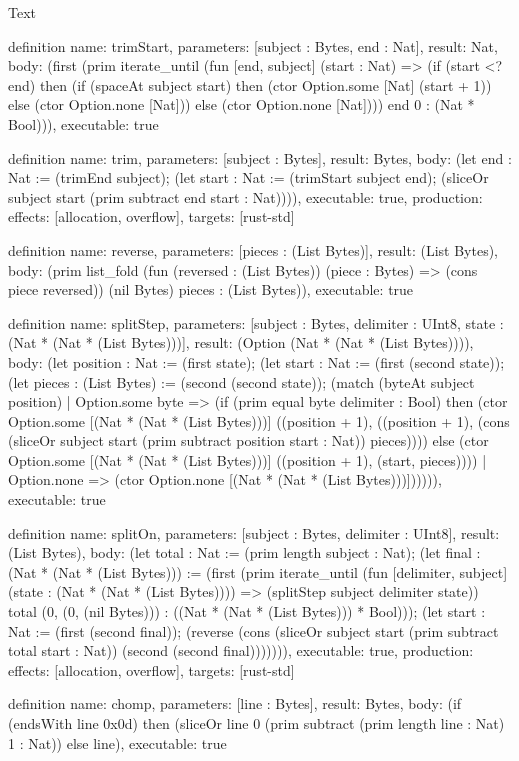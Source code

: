 \begin{lexlean}{Text}
\begin{semanticmodule}
definition{
  name: trimStart,
  parameters: [subject : Bytes, end : Nat],
  result: Nat,
  body: (first (prim iterate_until (fun [end, subject] (start : Nat) => (if (start <? end) then (if (spaceAt subject start) then (ctor Option.some [Nat] (start + 1)) else (ctor Option.none [Nat])) else (ctor Option.none [Nat]))) end 0 : (Nat * Bool))),
  executable: true
}

definition{
  name: trim,
  parameters: [subject : Bytes],
  result: Bytes,
  body: (let end : Nat := (trimEnd subject); (let start : Nat := (trimStart subject end); (sliceOr subject start (prim subtract end start : Nat)))),
  executable: true,
  production: {effects: [allocation, overflow], targets: [rust-std]}
}

definition{
  name: reverse,
  parameters: [pieces : (List Bytes)],
  result: (List Bytes),
  body: (prim list_fold (fun (reversed : (List Bytes)) (piece : Bytes) => (cons piece reversed)) (nil Bytes) pieces : (List Bytes)),
  executable: true
}

definition{
  name: splitStep,
  parameters: [subject : Bytes, delimiter : UInt8, state : (Nat * (Nat * (List Bytes)))],
  result: (Option (Nat * (Nat * (List Bytes)))),
  body: (let position : Nat := (first state); (let start : Nat := (first (second state)); (let pieces : (List Bytes) := (second (second state)); (match (byteAt subject position)
    | Option.some byte => (if (prim equal byte delimiter : Bool) then (ctor Option.some [(Nat * (Nat * (List Bytes)))] ((position + 1), ((position + 1), (cons (sliceOr subject start (prim subtract position start : Nat)) pieces)))) else (ctor Option.some [(Nat * (Nat * (List Bytes)))] ((position + 1), (start, pieces))))
    | Option.none => (ctor Option.none [(Nat * (Nat * (List Bytes)))]))))),
  executable: true
}

definition{
  name: splitOn,
  parameters: [subject : Bytes, delimiter : UInt8],
  result: (List Bytes),
  body: (let total : Nat := (prim length subject : Nat); (let final : (Nat * (Nat * (List Bytes))) := (first (prim iterate_until (fun [delimiter, subject] (state : (Nat * (Nat * (List Bytes)))) => (splitStep subject delimiter state)) total (0, (0, (nil Bytes))) : ((Nat * (Nat * (List Bytes))) * Bool))); (let start : Nat := (first (second final)); (reverse (cons (sliceOr subject start (prim subtract total start : Nat)) (second (second final))))))),
  executable: true,
  production: {effects: [allocation, overflow], targets: [rust-std]}
}

definition{
  name: chomp,
  parameters: [line : Bytes],
  result: Bytes,
  body: (if (endsWith line 0x0d) then (sliceOr line 0 (prim subtract (prim length line : Nat) 1 : Nat)) else line),
  executable: true
}


\end{semanticmodule}
\end{lexlean}
